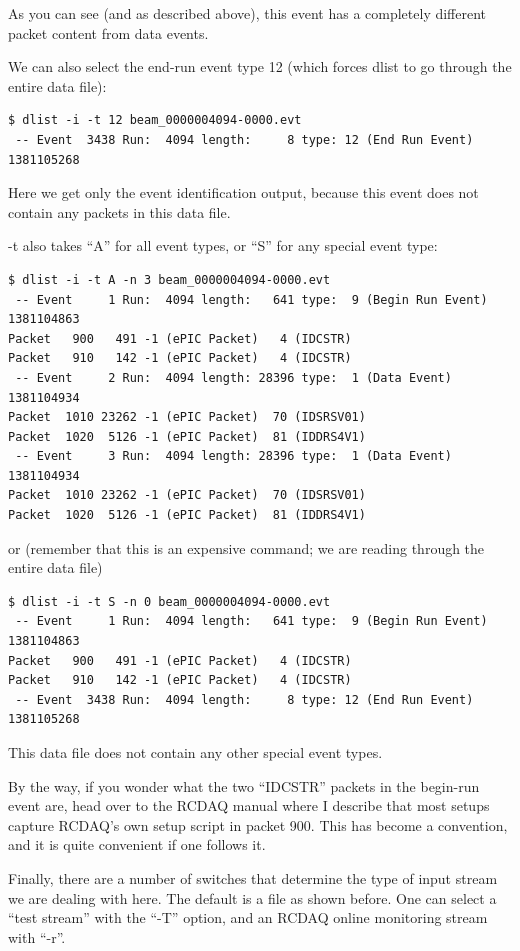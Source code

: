 \documentclass{article}[11pt]
\begin{document}
As you can see (and as described above), this event has a completely
different packet content from data events.

We can also select the end-run event type 12 (which forces dlist to go through
the entire data file):

\begin{verbatim}
$ dlist -i -t 12 beam_0000004094-0000.evt
 -- Event  3438 Run:  4094 length:     8 type: 12 (End Run Event)  1381105268
\end{verbatim}

Here we get only the event identification output, because this event
does not contain any packets in this data file. 

-t also takes ``A'' for all event types, or ``S'' for any special event type:

\begin{verbatim}
$ dlist -i -t A -n 3 beam_0000004094-0000.evt
 -- Event     1 Run:  4094 length:   641 type:  9 (Begin Run Event)  1381104863
Packet   900   491 -1 (ePIC Packet)   4 (IDCSTR)
Packet   910   142 -1 (ePIC Packet)   4 (IDCSTR)
 -- Event     2 Run:  4094 length: 28396 type:  1 (Data Event)  1381104934
Packet  1010 23262 -1 (ePIC Packet)  70 (IDSRSV01)
Packet  1020  5126 -1 (ePIC Packet)  81 (IDDRS4V1)
 -- Event     3 Run:  4094 length: 28396 type:  1 (Data Event)  1381104934
Packet  1010 23262 -1 (ePIC Packet)  70 (IDSRSV01)
Packet  1020  5126 -1 (ePIC Packet)  81 (IDDRS4V1)
\end{verbatim}

or (remember that this is an expensive command; we are reading through
the entire data file)

\begin{verbatim}
$ dlist -i -t S -n 0 beam_0000004094-0000.evt
 -- Event     1 Run:  4094 length:   641 type:  9 (Begin Run Event)  1381104863
Packet   900   491 -1 (ePIC Packet)   4 (IDCSTR)
Packet   910   142 -1 (ePIC Packet)   4 (IDCSTR)
 -- Event  3438 Run:  4094 length:     8 type: 12 (End Run Event)  1381105268
\end{verbatim}

This data file does not contain any other special event types.

By the way, if you wonder what the two ``IDCSTR'' packets in the
begin-run event are, head over to the RCDAQ manual where I describe
that most setups capture RCDAQ's own setup script in packet 900. This
has become a convention, and it is quite convenient if one follows it.

Finally, there are a number of switches that determine the type of
input stream we are dealing with here. The default is a file as shown
before. One can select a ``test stream'' with the ``-T''
option, and an RCDAQ online monitoring stream with ``-r''.
\end{document}
